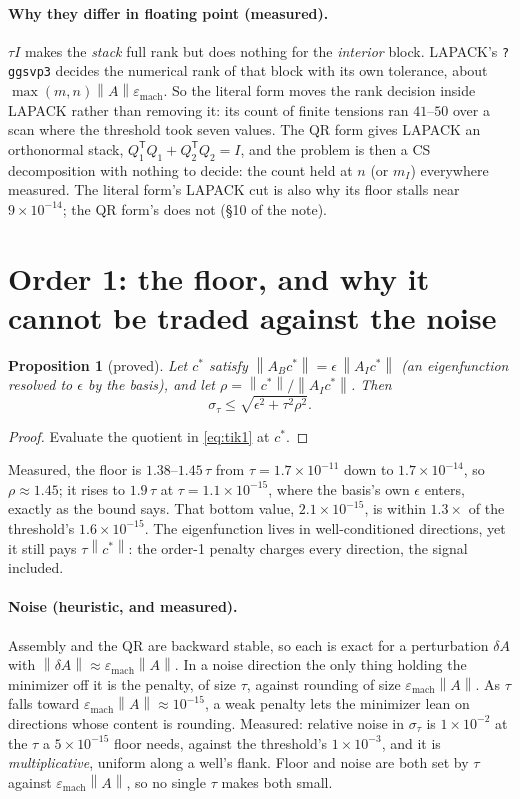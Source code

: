 \documentclass[11pt]{article}
\newtheorem{proposition}{Proposition}
\theoremstyle{definition}
\theoremstyle{remark}
\newcommand{\code}[1]{\texttt{#1}}
\newcommand{\sig}{\sigma}
\newcommand{\eps}{\varepsilon_{\mathrm{mach}}}
\newcommand{\norm}[1]{\left\lVert #1 \right\rVert}
\newcommand{\AB}{A_B}
\newcommand{\AI}{A_I}
\begin{document}
\paragraph{Why they differ in floating point (measured).} $\tau I$ makes the \emph{stack} full rank
but does nothing for the \emph{interior} block. LAPACK's \code{?ggsvp3} decides the numerical
rank of that block with its own tolerance, about $\max(m,n)\norm{A}\eps$. So the literal form
moves the rank decision inside LAPACK rather than removing it: its count of finite tensions ran
$41$--$50$ over a scan where the threshold took seven values. The QR form gives LAPACK an
orthonormal stack, $Q_1^{\mathsf T}Q_1 + Q_2^{\mathsf T}Q_2 = I$, and the problem is then a CS
decomposition with nothing to decide: the count held at $n$ (or $m_I$) everywhere measured. The
literal form's LAPACK cut is also why its floor stalls near $9\times10^{-14}$; the QR form's does
not (\S10 of the note).

\section{Order 1: the floor, and why it cannot be traded against the noise}

\begin{proposition}[proved]\label{prop:floor1}
Let $c^\ast$ satisfy $\norm{\AB c^\ast} = \epsilon\,\norm{\AI c^\ast}$ (an eigenfunction resolved to
$\epsilon$ by the basis), and let $\rho = \norm{c^\ast}/\norm{\AI c^\ast}$. Then
\[
  \sig_\tau \le \sqrt{\epsilon^2 + \tau^2\rho^2}.
\]
\end{proposition}
\begin{proof}
Evaluate the quotient in \eqref{eq:tik1} at $c^\ast$.
\end{proof}

Measured, the floor is $1.38$--$1.45\,\tau$ from $\tau = 1.7\times10^{-11}$ down to
$1.7\times10^{-14}$, so $\rho\approx1.45$; it rises to $1.9\,\tau$ at $\tau=1.1\times10^{-15}$, where
the basis's own $\epsilon$ enters, exactly as the bound says. That bottom value, $2.1\times10^{-15}$,
is within $1.3\times$ of the threshold's $1.6\times10^{-15}$.
The eigenfunction lives in well-conditioned directions, yet it still pays $\tau\norm{c^\ast}$: the
order-1 penalty charges every direction, the signal included.

\paragraph{Noise (heuristic, and measured).} Assembly and the QR are backward stable, so each is
exact for a perturbation $\delta A$ with $\norm{\delta A}\approx\eps\norm{A}$. In a noise direction
the only thing holding the minimizer off it is the penalty, of size $\tau$, against rounding of
size $\eps\norm{A}$. As $\tau$ falls toward $\eps\norm{A}\approx 10^{-15}$, a weak penalty lets the
minimizer lean on directions whose content is rounding. Measured: relative noise in $\sig_\tau$ is
$1\times10^{-2}$ at the $\tau$ a $5\times10^{-15}$ floor needs, against the threshold's
$1\times10^{-3}$, and it is \emph{multiplicative}, uniform along a well's flank. Floor and noise are
both set by $\tau$ against $\eps\norm{A}$, so no single $\tau$ makes both small.
\end{document}
